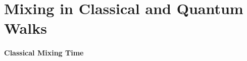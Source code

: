 \documentclass[12pt]{report}
\begin{document}
\section{Mixing in Classical and Quantum Walks}

\paragraph{Classical Mixing Time}
\end{document}
